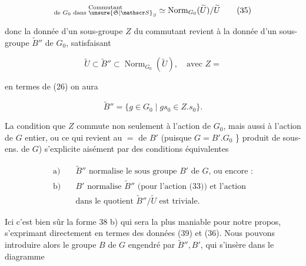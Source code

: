 \[ \substack{\text{Commutant}\\\text{de }G_0\text{ dans }\unsure{\mathfrak S|\mathscr S}_S}\simeq\operatorname{Norm}_{G_0}(\widetilde U)/\widetilde U \tag*{(35)} \]

donc la donnée d'un sous-groupe $Z$ du commutant revient à la donnée d'un sous-groupe $\widetilde B''$ de $G_0$,  satisfaisant

\[ \widetilde U\subset\widetilde B''\subset\operatorname{Norm}_{G_0}(\widetilde U),\quad\text{avec }Z= \tag*{(36)} \]


en termes de (26) on aura

\[ \widetilde B''=\{g\in G_0\mid gs_0\in Z.s_0\}.\tag*{(37)} \]

La condition que $Z$ commute non seulement à l'action de $G_0$, mais aussi à l'action de $G$  entier, ou ce qui revient au $=$ de $B'$ (puisque $G=B'.G_0$ \} produit de sous-ens. de $G$) s'explicite aisément par  des conditions équivalentes

\[
\begin{aligned}
\text{a)}\quad&\widetilde B''\text{ normalise le sous groupe $B'$ de $G$, ou encore :}\\
\text{b)}\quad&B'\text{ normalise $\widetilde B''$ (pour l'action (33)) et l'action}\\
&\text{dans le quotient $\widetilde B''/\widetilde U$ est triviale.}
\end{aligned}\tag*{(38)}
\]

Ici c'est bien sûr la forme 38 b) qui sera la plus maniable pour notre propos,  s'exprimant directement en termes des données (39) et (36). Nous pouvons introduire alors le groupe $B$ de $G$ engendré par $\widetilde B'',B'$, qui s'insère dans le diagramme



